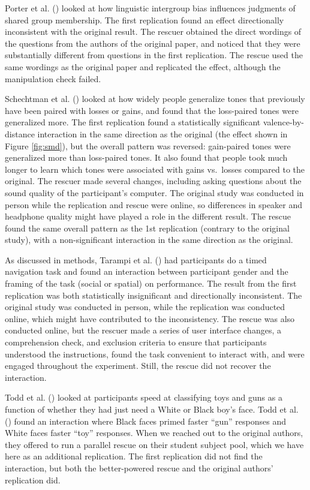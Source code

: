\documentclass[
  english,
  a4paper,
]{article}
\begin{document}
Porter et al. () looked at how linguistic intergroup bias influences judgments of shared group membership.
The first replication found an effect directionally inconsistent with the original result.
The rescuer obtained the direct wordings of the questions from the authors of the original paper, and noticed that they were substantially different from questions in the first replication.
The rescue used the same wordings as the original paper and replicated the effect, although the manipulation check failed.

Schechtman et al. () looked at how widely people generalize tones that previously have been paired with losses or gains, and found that the loss-paired tones were generalized more.
The first replication found a statistically significant valence-by-distance interaction in the same direction as the original (the effect shown in Figure \ref{fig:smd}), but the overall pattern was reversed: gain-paired tones were generalized more than loss-paired tones.
It also found that people took much longer to learn which tones were associated with gains vs.~losses compared to the original.
The rescuer made several changes, including asking questions about the sound quality of the participant's computer.
The original study was conducted in person while the replication and rescue were online, so differences in speaker and headphone quality might have played a role in the different result.
The rescue found the same overall pattern as the 1st replication (contrary to the original study), with a non-significant interaction in the same direction as the original.

As discussed in methods, Tarampi et al. () had participants do a timed navigation task and found an interaction between participant gender and the framing of the task (social or spatial) on performance.
The result from the first replication was both statistically insignificant and directionally inconsistent.
The original study was conducted in person, while the replication was conducted online, which might have contributed to the inconsistency.
The rescue was also conducted online, but the rescuer made a series of user interface changes, a comprehension check, and exclusion criteria to ensure that participants understood the instructions, found the task convenient to interact with, and were engaged throughout the experiment.
Still, the rescue did not recover the interaction.

Todd et al. () looked at participants speed at classifying toys and guns as a function of whether they had just need a White or Black boy's face.
Todd et al. () found an interaction where Black faces primed faster ``gun'' responses and White faces faster ``toy'' responses.
When we reached out to the original authors, they offered to run a parallel rescue on their student subject pool, which we have here as an additional replication.
The first replication did not find the interaction, but both the better-powered rescue and the original authors' replication did.
\end{document}
